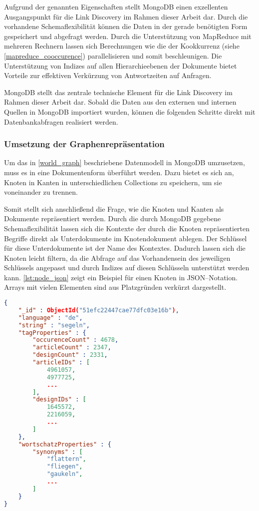Aufgrund der genannten Eigenschaften stellt MongoDB einen exzellenten Ausgangspunkt für die Link Discovery im Rahmen dieser Arbeit dar. Durch die vorhandene Schemaflexibilität können die Daten in der gerade benötigten Form gespeichert und abgefragt werden. Durch die Unterstützung von MapReduce mit mehreren Rechnern lassen sich Berechnungen wie die der Kookkurrenz (siehe \cref{mapreduce_cooccurence}) parallelisieren und somit beschleunigen. Die Unterstützung von Indizes auf allen Hierarchieebenen der Dokumente bietet Vorteile zur effektiven Verkürzung von Antwortzeiten auf Anfragen.

MongoDB stellt das zentrale technische Element für die Link Discovery im Rahmen dieser Arbeit dar. Sobald die Daten aus den externen und internen Quellen in MongoDB importiert wurden, können die folgenden Schritte direkt mit Datenbankabfragen realisiert werden.

\clearpage

\subsubsection{Umsetzung der Graphenrepräsentation}

Um das in \cref{world_graph} beschriebene Datenmodell in MongoDB umzusetzen, muss es in eine Dokumentenform überführt werden. Dazu bietet es sich an, Knoten in Kanten in unterschiedlichen Collections zu speichern, um sie voneinander zu trennen.

Somit stellt sich anschließend die Frage, wie die Knoten und Kanten als Dokumente repräsentiert werden. Durch die durch MongoDB gegebene Schemaflexibilität lassen sich die Kontexte der durch die Knoten repräsentierten Begriffe direkt als Unterdokumente im Knotendokument ablegen. Der Schlüssel für diese Unterdokumente ist der Name des Kontextes. Dadurch lassen sich die Knoten leicht filtern, da die Abfrage auf das Vorhandensein des jeweiligen Schlüssels angepasst und durch Indizes auf diesen Schlüsseln unterstützt werden kann. \cref{lst:node_json} zeigt ein Beispiel für einen Knoten in JSON--Notation. Arrays mit vielen Elementen sind aus Platzgründen verkürzt dargestellt.

\begin{lstlisting}[language=json, label={lst:node_json}, caption={JSON--Beispiel für ein Knotendokument in MongoDB}, float=ht]
{
    "_id" : ObjectId("51efc22447cae77dfc03e16b"),
    "language" : "de",
    "string" : "segeln",
    "tagProperties" : {
        "occurenceCount" : 4678,
        "articleCount" : 2347,
        "designCount" : 2331,
        "articleIDs" : [ 
            4961057, 
            4977725, 
            ...
        ],
        "designIDs" : [ 
            1645572, 
            2216059, 
            ...
        ]
    },
    "wortschatzProperties" : {
        "synonyms" : [ 
            "flattern", 
            "fliegen", 
            "gaukeln", 
            ...
        ]
    }
}
\end{lstlisting}

